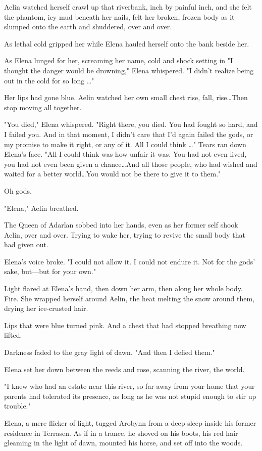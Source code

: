 Aelin watched herself crawl up that riverbank, inch by painful inch, and she felt the phantom, icy mud beneath her nails, felt her broken, frozen body as it slumped onto the earth and shuddered, over and over.

As lethal cold gripped her while Elena hauled herself onto the bank beside her.

As Elena lunged for her, screaming her name, cold and shock setting in 
"I thought the danger would be drowning," Elena whispered.
"I didn't realize being out in the cold for so long \ldots"

Her lips had gone blue.
Aelin watched her own small chest rise, fall, rise\ldots Then stop moving all together.

"You died," Elena whispered.
"Right there, you died.
You had fought so hard, and I failed you.
And in that moment, I didn't care that I'd again failed the gods, or my promise to make it right, or any of it.
All I could think \ldots" Tears ran down Elena's face.
"All I could think was how unfair it was.
You had not even lived, you had not even been given a chance\ldots And all those people, who had wished and waited for a better world\ldots You would not be there to give it to them."

Oh gods.

"Elena," Aelin breathed.

The Queen of Adarlan sobbed into her hands, even as her former self shook Aelin, over and over.
Trying to wake her, trying to revive the small body that had given out.

Elena's voice broke.
"I could not allow it.
I could not endure it.
Not for the gods' sake, but---but for your own."

Light flared at Elena's hand, then down her arm, then along her whole body.
Fire.
She wrapped herself around Aelin, the heat melting the snow around them, drying her ice-crusted hair.

Lips that were blue turned pink.
And a chest that had stopped breathing now lifted.

Darkness faded to the gray light of dawn.
"And then I defied them."

Elena set her down between the reeds and rose, scanning the river, the world.

"I knew who had an estate near this river, so far away from your home that your parents had tolerated its presence, as long as he was not stupid enough to stir up trouble."

Elena, a mere flicker of light, tugged Arobynn from a deep sleep inside his former residence in Terrasen.
As if in a trance, he shoved on his boots, his red hair gleaming in the light of dawn, mounted his horse, and set off into the woods.

